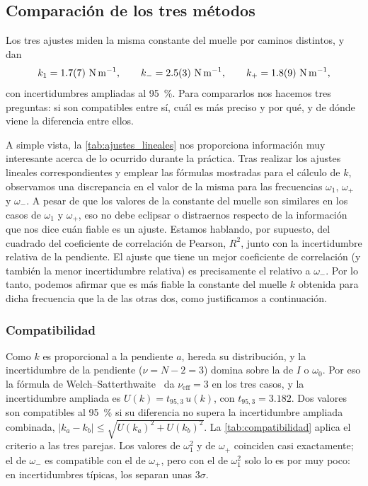 \documentclass[a4paper,11pt]{amsart}
\numberwithin{equation}{section}
\newcommand{\wz}{\omega_0}                    %
\newcommand{\wu}{\omega_1}                    %
\newcommand{\wm}{\omega_{-}}                  %
\newcommand{\wpl}{\omega_{+}}                 %
\newcommand{\ext}[1]{U(#1)}                   %
\theoremstyle{cienplano}
\theoremstyle{ciendef}
\theoremstyle{cienobs}
\begin{document}
\subsection{Comparación de los tres métodos}\label{sec:comparacion}
Los tres ajustes miden la misma constante del muelle por caminos distintos, y
dan
\begin{equation}\label{eq:ktres}
  k_{1}=\valKUno\ \si{\newton\per\meter},
  \qquad
  k_{-}=\valKMenos\ \si{\newton\per\meter},
  \qquad
  k_{+}=\valKMas\ \si{\newton\per\meter},
\end{equation}
con incertidumbres ampliadas al \SI{95}{\percent}. Para compararlos nos hacemos
tres preguntas: si son compatibles entre sí, cuál es más preciso y por qué, y
de dónde viene la diferencia entre ellos.

A simple vista, la \cref{tab:ajustes_lineales} nos proporciona información
muy interesante acerca de lo ocurrido durante la práctica. Tras realizar los
ajustes lineales correspondientes y emplear las fórmulas mostradas para el
cálculo de $k$, observamos una discrepancia en el valor de la misma para las
frecuencias $\wu$, $\wpl$ y $\wm$. A pesar de que los valores de la constante
del muelle son similares en los casos de $\wu$ y $\wpl$, eso no debe
eclipsar o distraernos respecto de la información que nos dice cuán fiable es
un ajuste. Estamos hablando, por supuesto, del cuadrado del coeficiente de
correlación de Pearson, $R^{2}$, junto con la incertidumbre relativa de la
pendiente. El ajuste que tiene un mejor coeficiente de correlación (y también
la menor incertidumbre relativa) es precisamente el relativo a $\wm$. Por lo
tanto, podemos afirmar que es más fiable la constante del muelle $k$ obtenida
para dicha frecuencia que la de las otras dos, como justificamos a
continuación.

\subsubsection{Compatibilidad}
Como $k$ es proporcional a la pendiente $a$, hereda su distribución, y la
incertidumbre de la pendiente ($\nu=N-2=3$) domina sobre la de $I$ o $\wz$.
Por eso la fórmula de Welch--Satterthwaite~\cite[ec.~(67)]{NUM-ARG} da
$\nu_{\text{eff}}=3$ en los tres casos, y la incertidumbre ampliada es
$\ext{k}=t_{95,3}\,u(k)$, con $t_{95,3}=\num{3,182}$. Dos valores son
compatibles al \SI{95}{\percent} si su diferencia no supera la incertidumbre
ampliada combinada, $|k_a-k_b|\le\sqrt{\ext{k_a}^{2}+\ext{k_b}^{2}}$. La
\cref{tab:compatibilidad} aplica el criterio a las tres parejas. Los valores
de $\wu^{2}$ y de $\wpl$ coinciden casi exactamente; el de $\wm$ es compatible
con el de $\wpl$, pero con el de $\wu^{2}$ solo lo es por muy poco: en
incertidumbres típicas, los separan unas $3\sigma$.
\end{document}
